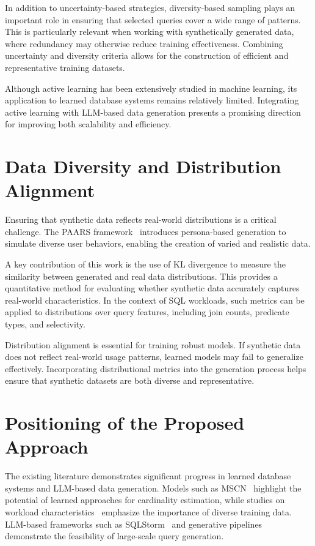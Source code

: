In addition to uncertainty-based strategies, diversity-based sampling plays an important role in ensuring that selected queries cover a wide range of patterns. This is particularly relevant when working with synthetically generated data, where redundancy may otherwise reduce training effectiveness. Combining uncertainty and diversity criteria allows for the construction of efficient and representative training datasets.

Although active learning has been extensively studied in machine learning, its application to learned database systems remains relatively limited. Integrating active learning with LLM-based data generation presents a promising direction for improving both scalability and efficiency.

\section{Data Diversity and Distribution Alignment}

Ensuring that synthetic data reflects real-world distributions is a critical challenge. The PAARS framework~\cite{DBLP:journals/corr/abs-2503-24228} introduces persona-based generation to simulate diverse user behaviors, enabling the creation of varied and realistic data.

A key contribution of this work is the use of KL divergence to measure the similarity between generated and real data distributions. This provides a quantitative method for evaluating whether synthetic data accurately captures real-world characteristics. In the context of SQL workloads, such metrics can be applied to distributions over query features, including join counts, predicate types, and selectivity.

Distribution alignment is essential for training robust models. If synthetic data does not reflect real-world usage patterns, learned models may fail to generalize effectively. Incorporating distributional metrics into the generation process helps ensure that synthetic datasets are both diverse and representative.

\section{Positioning of the Proposed Approach}

The existing literature demonstrates significant progress in learned database systems and LLM-based data generation. Models such as MSCN~\cite{DBLP:conf/cidr/KipfKRLBK19} highlight the potential of learned approaches for cardinality estimation, while studies on workload characteristics~\cite{DBLP:journals/pvldb/WangQWWZ21} emphasize the importance of diverse training data. LLM-based frameworks such as SQLStorm~\cite{DBLP:journals/pvldb/SchmidtLBN25} and generative pipelines~\cite{DBLP:journals/corr/abs-2512-20271} demonstrate the feasibility of large-scale query generation.

